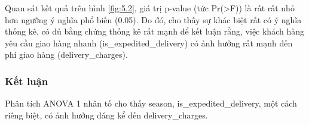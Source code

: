     Quan sát kết quả trên hình \ref{fig:5.2}, giá trị p-value (tức Pr(>F)) là rất rất nhỏ hơn ngưỡng ý nghĩa phổ biến (0.05). Do đó, cho thấy sự
khác biệt rất có ý nghĩa thống kê, có đủ bằng chứng thống kê rất mạnh để kết luận rằng, việc khách hàng yêu cầu giao hàng nhanh (is\_expedited\_delivery) có ảnh hưởng rất mạnh đến phí giao hàng (delivery\_charges).
\subsubsection{Kết luận}
Phân tích ANOVA 1 nhân tố cho thấy season, is\_expedited\_delivery, một cách riêng biệt, có ảnh hưởng đáng kể đến delivery\_charges.
